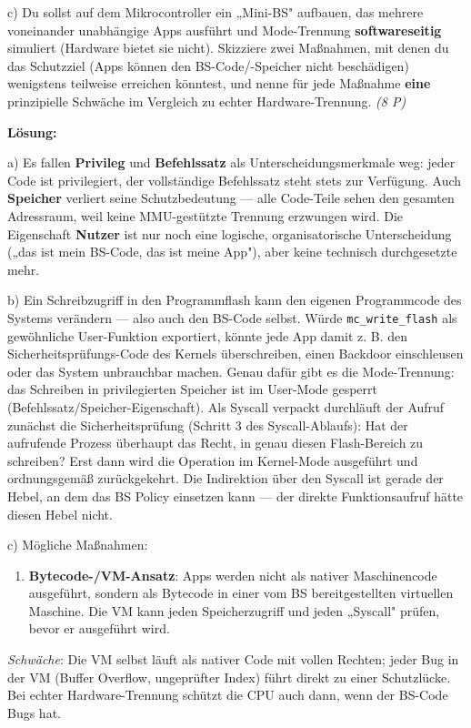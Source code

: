 \documentclass[11pt, a4paper]{article}
\begin{document}
c) Du sollst auf dem Mikrocontroller ein „Mini-BS" aufbauen, das mehrere voneinander unabhängige Apps ausführt und Mode-Trennung \textbf{softwareseitig} simuliert (Hardware bietet sie nicht). Skizziere zwei Maßnahmen, mit denen du das Schutzziel (Apps können den BS-Code/-Speicher nicht beschädigen) wenigstens teilweise erreichen könntest, und nenne für jede Maßnahme \textbf{eine} prinzipielle Schwäche im Vergleich zu echter Hardware-Trennung. \textit{(8 P)}


\textbf{Lösung:}


a) Es fallen \textbf{Privileg} und \textbf{Befehlssatz} als Unterscheidungsmerkmale weg: jeder Code ist privilegiert, der vollständige Befehlssatz steht stets zur Verfügung. Auch \textbf{Speicher} verliert seine Schutzbedeutung — alle Code-Teile sehen den gesamten Adressraum, weil keine MMU-gestützte Trennung erzwungen wird. Die Eigenschaft \textbf{Nutzer} ist nur noch eine logische, organisatorische Unterscheidung („das ist mein BS-Code, das ist meine App"), aber keine technisch durchgesetzte mehr.


b) Ein Schreibzugriff in den Programmflash kann den eigenen Programmcode des Systems verändern — also auch den BS-Code selbst. Würde \texttt{mc\_write\_flash} als gewöhnliche User-Funktion exportiert, könnte jede App damit z. B. den Sicherheitsprüfungs-Code des Kernels überschreiben, einen Backdoor einschleusen oder das System unbrauchbar machen. Genau dafür gibt es die Mode-Trennung: das Schreiben in privilegierten Speicher ist im User-Mode gesperrt (Befehlssatz/Speicher-Eigenschaft). Als Syscall verpackt durchläuft der Aufruf zunächst die Sicherheitsprüfung (Schritt 3 des Syscall-Ablaufs): Hat der aufrufende Prozess überhaupt das Recht, in genau diesen Flash-Bereich zu schreiben? Erst dann wird die Operation im Kernel-Mode ausgeführt und ordnungsgemäß zurückgekehrt. Die Indirektion über den Syscall ist gerade der Hebel, an dem das BS Policy einsetzen kann — der direkte Funktionsaufruf hätte diesen Hebel nicht.


c) Mögliche Maßnahmen:


\begin{enumerate}
  \item \textbf{Bytecode-/VM-Ansatz}: Apps werden nicht als nativer Maschinencode ausgeführt, sondern als Bytecode in einer vom BS bereitgestellten virtuellen Maschine. Die VM kann jeden Speicherzugriff und jeden „Syscall" prüfen, bevor er ausgeführt wird.
\end{enumerate}
\textit{Schwäche}: Die VM selbst läuft als nativer Code mit vollen Rechten; jeder Bug in der VM (Buffer Overflow, ungeprüfter Index) führt direkt zu einer Schutzlücke. Bei echter Hardware-Trennung schützt die CPU auch dann, wenn der BS-Code Bugs hat.
\end{document}

